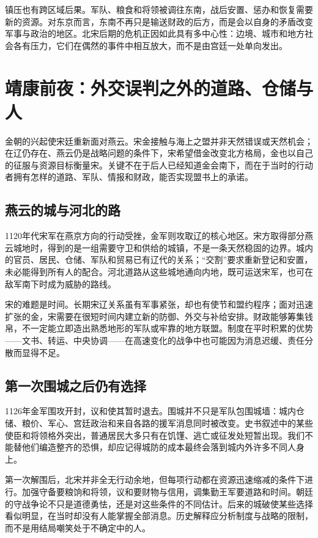 镇压也有跨区域后果。军队、粮食和将领被调往东南，战后安置、惩办和恢复需要新的资源。对东京而言，东南不再只是输送财政的后方，而是会以自身的矛盾改变军事与政治的地区。北宋后期的危机正因如此具有多中心性：边境、城市和地方社会各有压力，它们在偶然的事件中相互放大，而不是由宫廷一处单向发出。

\section{靖康前夜：外交误判之外的道路、仓储与人}

金朝的兴起使宋廷重新面对燕云。宋金接触与海上之盟并非天然错误或天然机会；在辽仍存在、燕云仍是战略问题的条件下，宋希望借金改变北方格局，金也以自己的征服与资源目标衡量宋。关键不在于后人已经知道金会南下，而在于当时的行动者拥有怎样的道路、军队、情报和财政，能否实现盟书上的承诺。

\subsection{燕云的城与河北的路}

1120年代宋军在燕京方向的行动受挫，金军则攻取辽的核心地区。宋方取得部分燕云城地时，得到的是一组需要守卫和供给的城镇，不是一条天然稳固的边界。城内的官员、居民、仓储、军队和贸易已有辽代的关系；“交割”要求重新登记和安置，未必能得到所有人的配合。河北道路从这些城地通向内地，既可运送宋军，也可在敌军南下时成为威胁的路线。

宋的难题是时间。长期宋辽关系虽有军事紧张，却也有使节和盟约程序；面对迅速扩张的金，宋需要在很短时间内建立新的防御、外交与补给安排。财政能够筹集钱帛，不一定能立即造出熟悉地形的军队或牢靠的地方联盟。制度在平时积累的优势——文书、转运、中央协调——在高速变化的战争中也可能因为消息迟缓、责任分散而显得不足。

\subsection{第一次围城之后仍有选择}

1126年金军围攻开封，议和使其暂时退去。围城并不只是军队包围城墙：城内仓储、粮价、军心、宫廷政治和来自各路的援军消息同时被改变。史书叙述中的某些使臣和将领格外突出，普通居民大多只有在饥馑、逃亡或征发处短暂出现。我们不能替他们编造整齐的恐惧，却应记得城防的成本最终会落到城内外许多不同人身上。

第一次解围后，北宋并非全无行动余地，但每项行动都在资源迅速缩减的条件下进行。加强守备要粮饷和将领，议和要财物与信用，调集勤王军要道路和时间。朝廷的守战争论不只是道德勇怯，还是对这些条件的不同估计。后来的城破使某些选择看似明显，在当时却没有人能掌握全部消息。历史解释应分析制度与战略的限制，而不是用结局嘲笑处于不确定中的人。

